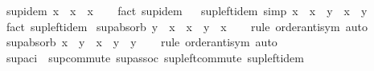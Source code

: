\begin{isabellebody}
\endisatagproof
{\isafoldproof}%
%
\isadelimproof
\isanewline
%
\endisadelimproof
\isanewline
{}\isamarkupfalse%
\ sup{\isacharunderscore}{\kern0pt}idem{\isacharcolon}{\kern0pt}\ {\isachardoublequoteopen}x\ {\isasymsqunion}\ x\ {\isacharequal}{\kern0pt}\ x{\isachardoublequoteclose}\isanewline
%
\isadelimproof
\ \ %
\endisadelimproof
%
\isatagproof
{}\isamarkupfalse%
\ {\isacharparenleft}{\kern0pt}fact\ sup{\isachardot}{\kern0pt}idem{\isacharparenright}{\kern0pt}%
\endisatagproof
{\isafoldproof}%
%
\isadelimproof
%
\endisadelimproof
\ \isanewline
\isanewline
{}\isamarkupfalse%
\ sup{\isacharunderscore}{\kern0pt}left{\isacharunderscore}{\kern0pt}idem\ {\isacharbrackleft}{\kern0pt}simp{\isacharbrackright}{\kern0pt}{\isacharcolon}{\kern0pt}\ {\isachardoublequoteopen}x\ {\isasymsqunion}\ {\isacharparenleft}{\kern0pt}x\ {\isasymsqunion}\ y{\isacharparenright}{\kern0pt}\ {\isacharequal}{\kern0pt}\ x\ {\isasymsqunion}\ y{\isachardoublequoteclose}\isanewline
%
\isadelimproof
\ \ %
\endisadelimproof
%
\isatagproof
{}\isamarkupfalse%
\ {\isacharparenleft}{\kern0pt}fact\ sup{\isachardot}{\kern0pt}left{\isacharunderscore}{\kern0pt}idem{\isacharparenright}{\kern0pt}%
\endisatagproof
{\isafoldproof}%
%
\isadelimproof
\isanewline
%
\endisadelimproof
\isanewline
{}\isamarkupfalse%
\ sup{\isacharunderscore}{\kern0pt}absorb{}{\isacharcolon}{\kern0pt}\ {\isachardoublequoteopen}y\ {\isasymle}\ x\ {\isasymLongrightarrow}\ x\ {\isasymsqunion}\ y\ {\isacharequal}{\kern0pt}\ x{\isachardoublequoteclose}\isanewline
%
\isadelimproof
\ \ %
\endisadelimproof
%
\isatagproof
{}\isamarkupfalse%
\ {\isacharparenleft}{\kern0pt}rule\ order{\isachardot}{\kern0pt}antisym{\isacharparenright}{\kern0pt}\ auto%
\endisatagproof
{\isafoldproof}%
%
\isadelimproof
\isanewline
%
\endisadelimproof
\isanewline
{}\isamarkupfalse%
\ sup{\isacharunderscore}{\kern0pt}absorb{}{\isacharcolon}{\kern0pt}\ {\isachardoublequoteopen}x\ {\isasymle}\ y\ {\isasymLongrightarrow}\ x\ {\isasymsqunion}\ y\ {\isacharequal}{\kern0pt}\ y{\isachardoublequoteclose}\isanewline
%
\isadelimproof
\ \ %
\endisadelimproof
%
\isatagproof
{}\isamarkupfalse%
\ {\isacharparenleft}{\kern0pt}rule\ order{\isachardot}{\kern0pt}antisym{\isacharparenright}{\kern0pt}\ auto%
\endisatagproof
{\isafoldproof}%
%
\isadelimproof
\isanewline
%
\endisadelimproof
\isanewline
{}\isamarkupfalse%
\ sup{\isacharunderscore}{\kern0pt}aci\ {\isacharequal}{\kern0pt}\ sup{\isacharunderscore}{\kern0pt}commute\ sup{\isacharunderscore}{\kern0pt}assoc\ sup{\isacharunderscore}{\kern0pt}left{\isacharunderscore}{\kern0pt}commute\ sup{\isacharunderscore}{\kern0pt}left{\isacharunderscore}{\kern0pt}idem\isanewline

\end{isabellebody}
